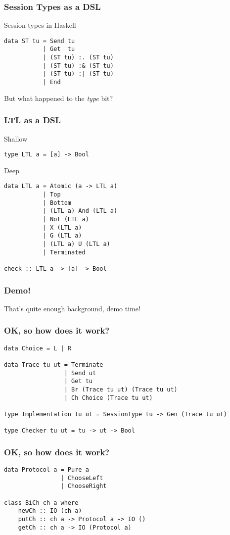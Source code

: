 \documentclass{beamer}
\begin{document}
\begin{frame}[fragile]
    \frametitle{Session Types as a DSL}
    \large{Session types in Haskell}
    \\
    \begin{verbatim}
data ST tu = Send tu
           | Get  tu
           | (ST tu) :. (ST tu)
           | (ST tu) :& (ST tu)
           | (ST tu) :| (ST tu)
           | End
    \end{verbatim}
    \pause
    But what happened to the \textit{type} bit?
\end{frame}

\begin{frame}[fragile]
    \frametitle{LTL as a DSL}
    \centering
    Shallow
    \begin{verbatim}
type LTL a = [a] -> Bool
    \end{verbatim}
    \pause
    \centering
    Deep
    \begin{verbatim}
data LTL a = Atomic (a -> LTL a)
           | Top 
           | Bottom
           | (LTL a) And (LTL a)
           | Not (LTL a)
           | X (LTL a)
           | G (LTL a)
           | (LTL a) U (LTL a)
           | Terminated

check :: LTL a -> [a] -> Bool
    \end{verbatim}
\end{frame}

\begin{frame}
    \frametitle{Demo!}
    \Large{That's quite enough background, demo time!}
\end{frame}

\begin{frame}[fragile]
    \frametitle{OK, so how does it work?}
    \small{
    \begin{verbatim}
data Choice = L | R

data Trace tu ut = Terminate
                 | Send ut
                 | Get tu
                 | Br (Trace tu ut) (Trace tu ut)
                 | Ch Choice (Trace tu ut)

type Implementation tu ut = SessionType tu -> Gen (Trace tu ut)

type Checker tu ut = tu -> ut -> Bool
    \end{verbatim}
}
\end{frame}

\begin{frame}[fragile]
    \frametitle{OK, so how does it work?}
    \begin{verbatim}
data Protocol a = Pure a
                | ChooseLeft
                | ChooseRight

class BiCh ch a where
    newCh :: IO (ch a)
    putCh :: ch a -> Protocol a -> IO ()
    getCh :: ch a -> IO (Protocol a)
    \end{verbatim}
\end{frame}
\end{document}

